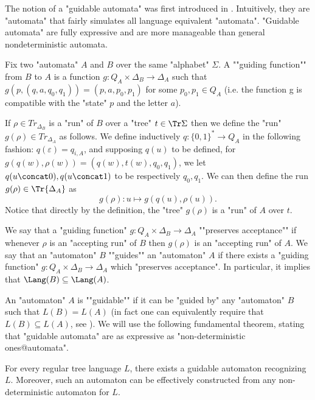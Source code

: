 \documentclass[a4paper,UKenglish,cleveref, autoref, thm-restate]{lipics-v2021}
\begin{document}
The notion of a "guidable automata" was first introduced in \cite{Guidable}.
Intuitively, they are "automata" that fairly simulates all language equivalent "automata". "Guidable automata" are fully expressive \cite[Theorem 1]{Guidable} and are more manageable than general nondeterministic automata. 

\AP Fix two "automata" $A$ and $B$ over the same "alphabet" $\Sigma$. A ""guiding function""
from $B$ to $A$ is a function $g : Q_A \times \Delta_B \to \Delta_A$ such that $g(p, (q, a, q_0 , q_1 )) = (p, a, p_0 , p_1)$
for some $p_0, p_1 \in Q_A$ (i.e. the function g is compatible with the "state" $p$ and the letter $a$). 

If $\rho \in Tr_{\Delta_B}$ is a "run" of $B$ over a "tree" $t \in \Tr\Sigma$ then we define the "run" $g (\rho) \in Tr_{\Delta_A}$ as follows. We define inductively $q : \{0,1\}^* \to Q_A$ in the following fashion: $q(\varepsilon) = q_{i,A}$, and supposing $q(u)$ to be defined, for $g(q(w),\rho(w))=(q(w),t(w),q_0,q_1)$, we let $q(u\concat 0),q(u\concat 1)$ to be respectively $q_0,q_1$. We can then define the run $g (\rho) \in \Tr{\Delta_A}$ as 
$$g(\rho): u \mapsto g(q(u),\rho(u)).$$
Notice that directly by the definition, the "tree" $g(\rho)$ is a "run" of $A$ over $t$. 

\AP We say that a "guiding function" $g : Q_A \times \Delta_B \to \Delta_A$ ""preserves acceptance"" if whenever $\rho$ is an "accepting run" of $B$ then $g(\rho)$ is an "accepting run" of $A$. We say that an "automaton" $B$ ""guides"" an "automaton" $A$ if there exists a "guiding function" $g : Q_A \times \Delta_B \to \Delta_A$ which "preserves acceptance". In particular, it implies that $\Lang(B) \subseteq \Lang(A)$.

\AP An "automaton" $A$ is ""guidable"" if it can be "guided by" any "automaton" $B$ such that $L(B) = L(A)$
(in fact one can equivalently require that $L(B) \subseteq L(A)$, see \cite[Remark 4.5]{lodingHDR}).
We will use the following fundamental theorem, stating that "guidable automata" are as expressive as "non-deterministic ones@automata".

\begin{theorem}
	For every regular tree language $L$, there exists a guidable automaton recognizing $L$. Moreover, such an automaton can be effectively constructed from any non-deterministic automaton for $L$.
\end{theorem}
\end{document}
